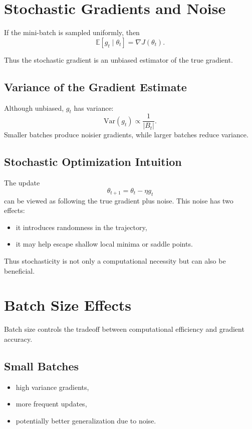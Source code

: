 \section{Stochastic Gradients and Noise}

\begin{proposition}
If the mini-batch is sampled uniformly, then
\[
\mathbb{E}[g_t \mid \theta_t]=\nabla J(\theta_t).
\]
\end{proposition}

Thus the stochastic gradient is an unbiased estimator of the true gradient.

\subsection{Variance of the Gradient Estimate}

Although unbiased, $g_t$ has variance:
\[
\mathrm{Var}(g_t) \propto \frac{1}{|B_t|}.
\]
Smaller batches produce noisier gradients, while larger batches reduce variance.

\subsection{Stochastic Optimization Intuition}

The update
\[
\theta_{t+1}=\theta_t-\eta g_t
\]
can be viewed as following the true gradient plus noise. This noise has two effects:
\begin{itemize}
    \item it introduces randomness in the trajectory,
    \item it may help escape shallow local minima or saddle points.
\end{itemize}

Thus stochasticity is not only a computational necessity but can also be beneficial.

\section{Batch Size Effects}

Batch size controls the tradeoff between computational efficiency and gradient accuracy.

\subsection{Small Batches}

\begin{itemize}
    \item high variance gradients,
    \item more frequent updates,
    \item potentially better generalization due to noise.
\end{itemize}

